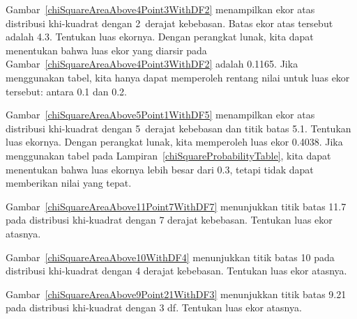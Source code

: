\begin{examplewrap}
\begin{nexample}{Gambar~\ref{chiSquareAreaAbove4Point3WithDF2}
    menampilkan ekor atas distribusi khi-kuadrat dengan
    2~derajat kebebasan.
    Batas ekor atas tersebut adalah 4.3.
    Tentukan luas ekornya.}
  Dengan perangkat lunak, kita dapat menentukan bahwa luas ekor yang diarsir pada
  Gambar~\ref{chiSquareAreaAbove4Point3WithDF2}
  adalah 0.1165.
  Jika menggunakan tabel, kita hanya dapat memperoleh
  rentang nilai untuk luas ekor tersebut:
  antara 0.1 dan 0.2.
\end{nexample}
\end{examplewrap}

\begin{examplewrap}
\begin{nexample}{Gambar~\ref{chiSquareAreaAbove5Point1WithDF5}
    menampilkan ekor atas distribusi khi-kuadrat dengan
    5~derajat kebebasan dan titik batas 5.1.
    Tentukan luas ekornya.}
  Dengan perangkat lunak, kita memperoleh luas ekor 0.4038.
  Jika menggunakan tabel pada Lampiran~\ref{chiSquareProbabilityTable},
  kita dapat menentukan bahwa luas ekornya lebih besar dari 0.3,
  tetapi tidak dapat memberikan nilai yang tepat.
\end{nexample}
\end{examplewrap}

\begin{exercisewrap}
\begin{nexercise}
Gambar~\ref{chiSquareAreaAbove11Point7WithDF7} menunjukkan titik batas
11.7 pada distribusi khi-kuadrat dengan 7 derajat kebebasan.
Tentukan luas ekor atasnya.\footnotemark{}
\end{nexercise}
\end{exercisewrap}

\begin{exercisewrap}
\begin{nexercise}
Gambar~\ref{chiSquareAreaAbove10WithDF4} menunjukkan titik batas
10 pada distribusi khi-kuadrat dengan 4 derajat kebebasan.
Tentukan luas ekor atasnya.\footnotemark{}
\end{nexercise}
\end{exercisewrap}

\begin{exercisewrap}
\begin{nexercise}
Gambar~\ref{chiSquareAreaAbove9Point21WithDF3} menunjukkan titik batas
9.21 pada distribusi khi-kuadrat dengan 3 df.
Tentukan luas ekor atasnya.\footnotemark{}
\end{nexercise}
\end{exercisewrap}


